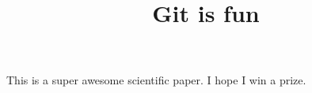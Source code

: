 \documentclass[10pt]{article}
\title{Git is fun}
\begin{document}
        \maketitle

        This is a super awesome scientific paper.
        I hope I win a prize.
\end{document}
